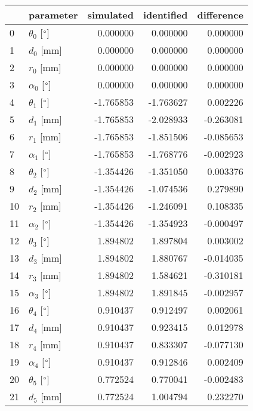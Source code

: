 \documentclass{standalone}%
\begin{document}
%
\normalsize%
\begin{tabular}{llrrr}
\toprule
{} &                 parameter & simulated & identified & difference \\
\midrule
0  &  $\theta_{0}$ [$\degree$] &  0.000000 &   0.000000 &   0.000000 \\
1  &              $d_{0}$ [mm] &  0.000000 &   0.000000 &   0.000000 \\
2  &              $r_{0}$ [mm] &  0.000000 &   0.000000 &   0.000000 \\
3  &  $\alpha_{0}$ [$\degree$] &  0.000000 &   0.000000 &   0.000000 \\
4  &  $\theta_{1}$ [$\degree$] & -1.765853 &  -1.763627 &   0.002226 \\
5  &              $d_{1}$ [mm] & -1.765853 &  -2.028933 &  -0.263081 \\
6  &              $r_{1}$ [mm] & -1.765853 &  -1.851506 &  -0.085653 \\
7  &  $\alpha_{1}$ [$\degree$] & -1.765853 &  -1.768776 &  -0.002923 \\
8  &  $\theta_{2}$ [$\degree$] & -1.354426 &  -1.351050 &   0.003376 \\
9  &              $d_{2}$ [mm] & -1.354426 &  -1.074536 &   0.279890 \\
10 &              $r_{2}$ [mm] & -1.354426 &  -1.246091 &   0.108335 \\
11 &  $\alpha_{2}$ [$\degree$] & -1.354426 &  -1.354923 &  -0.000497 \\
12 &  $\theta_{3}$ [$\degree$] &  1.894802 &   1.897804 &   0.003002 \\
13 &              $d_{3}$ [mm] &  1.894802 &   1.880767 &  -0.014035 \\
14 &              $r_{3}$ [mm] &  1.894802 &   1.584621 &  -0.310181 \\
15 &  $\alpha_{3}$ [$\degree$] &  1.894802 &   1.891845 &  -0.002957 \\
16 &  $\theta_{4}$ [$\degree$] &  0.910437 &   0.912497 &   0.002061 \\
17 &              $d_{4}$ [mm] &  0.910437 &   0.923415 &   0.012978 \\
18 &              $r_{4}$ [mm] &  0.910437 &   0.833307 &  -0.077130 \\
19 &  $\alpha_{4}$ [$\degree$] &  0.910437 &   0.912846 &   0.002409 \\
20 &  $\theta_{5}$ [$\degree$] &  0.772524 &   0.770041 &  -0.002483 \\
21 &              $d_{5}$ [mm] &  0.772524 &   1.004794 &   0.232270 \\

\end{tabular}
\end{document}
